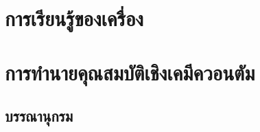 \part{การเรียนรู้ของเครื่อง}






\part{การทำนายคุณสมบัติเชิงเคมีควอนตัม}







\begin{appendices}
\renewcommand{\thesection}{\arabic{section}} %



\end{appendices}

\backmatter

\begin{@empty}
\chapter*{บรรณานุกรม}

\printbibliography[heading=none]
\end{@empty}

\printindex[th]
\printindex[en]




